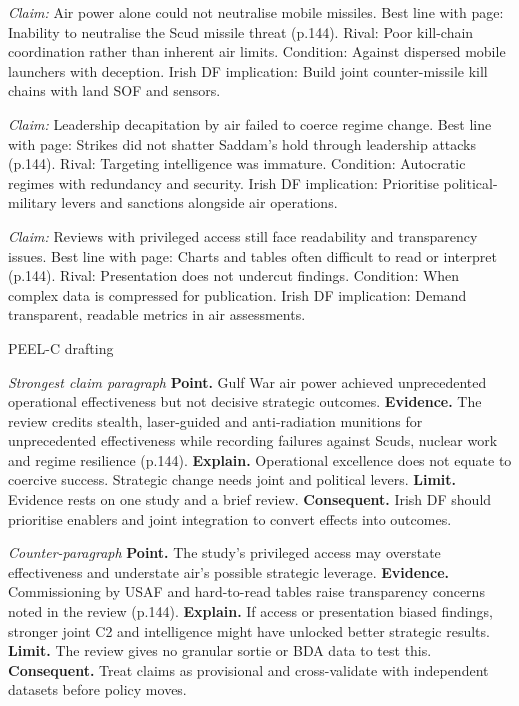 \textit{Claim:} Air power alone could not neutralise mobile missiles.
Best line with page: Inability to neutralise the Scud missile threat (p.144). Rival: Poor kill-chain coordination rather than inherent air limits. Condition: Against dispersed mobile launchers with deception. Irish DF implication: Build joint counter-missile kill chains with land SOF and sensors.

\textit{Claim:} Leadership decapitation by air failed to coerce regime change.
Best line with page: Strikes did not shatter Saddam’s hold through leadership attacks (p.144). Rival: Targeting intelligence was immature. Condition: Autocratic regimes with redundancy and security. Irish DF implication: Prioritise political-military levers and sanctions alongside air operations.

\textit{Claim:} Reviews with privileged access still face readability and transparency issues.
Best line with page: Charts and tables often difficult to read or interpret (p.144). Rival: Presentation does not undercut findings. Condition: When complex data is compressed for publication. Irish DF implication: Demand transparent, readable metrics in air assessments.

PEEL-C drafting

\textit{Strongest claim paragraph}
\textbf{Point.} Gulf War air power achieved unprecedented operational effectiveness but not decisive strategic outcomes.
\textbf{Evidence.} The review credits stealth, laser-guided and anti-radiation munitions for unprecedented effectiveness while recording failures against Scuds, nuclear work and regime resilience (p.144).
\textbf{Explain.} Operational excellence does not equate to coercive success. Strategic change needs joint and political levers.
\textbf{Limit.} Evidence rests on one study and a brief review.
\textbf{Consequent.} Irish DF should prioritise enablers and joint integration to convert effects into outcomes.

\textit{Counter-paragraph}
\textbf{Point.} The study’s privileged access may overstate effectiveness and understate air’s possible strategic leverage.
\textbf{Evidence.} Commissioning by USAF and hard-to-read tables raise transparency concerns noted in the review (p.144).
\textbf{Explain.} If access or presentation biased findings, stronger joint C2 and intelligence might have unlocked better strategic results.
\textbf{Limit.} The review gives no granular sortie or BDA data to test this.
\textbf{Consequent.} Treat claims as provisional and cross-validate with independent datasets before policy moves.

